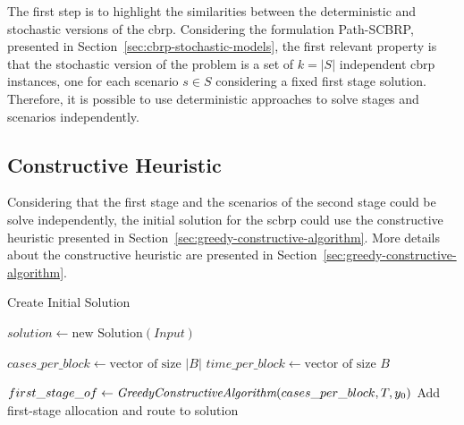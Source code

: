 The first step is to highlight the similarities between the deterministic and stochastic versions of the \gls{cbrp}. Considering the formulation Path-SCBRP, presented in Section~\ref{sec:cbrp-stochastic-models}, the first relevant property is that the stochastic version of the problem is a set of $k = |S|$ independent \gls{cbrp} instances, one for each scenario $s \in S$ considering a fixed first stage solution. Therefore, it is possible to use deterministic approaches to solve stages and scenarios independently.

\subsection{Constructive Heuristic}

Considering that the first stage and the scenarios of the second stage could be solve independently, the initial solution for the \gls{scbrp} could use the constructive heuristic presented in Section~\ref{sec:greedy-constructive-algorithm}. More details about the constructive heuristic are presented in Section~\ref{sec:greedy-constructive-algorithm}.


\begin{algorithm}[h!]
	\caption{Create Initial Solution}
	\SetAlgoLined
	
	$solution \leftarrow \text{new Solution}(Input)$\;
	
	$cases\_per\_block \leftarrow \text{vector of size } |B|$\;
	$time\_per\_block \leftarrow \text{vector of size } B$\;
	

	$first\_stage\_of \leftarrow \textit{GreedyConstructiveAlgorithm}(cases\_per\_block, T, y_0)$\;
	Add first-stage allocation and route to solution\;
	
	\;
	\end{algorithm}

